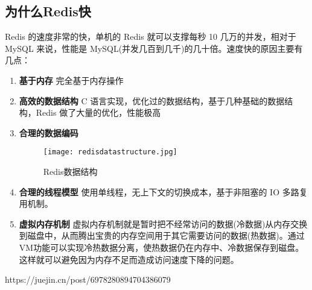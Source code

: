 \documentclass[../../../interview-questions.tex]{subfiles}
\begin{document}
\subsection{为什么Redis快}

Redis 的速度非常的快，单机的 Redis 就可以支撑每秒 10 几万的并发，相对于 MySQL 来说，性能是 MySQL(并发几百到几千)的几十倍。速度快的原因主要有几点：

\begin{enumerate}
    \item {\bf{基于内存}} 完全基于内存操作
    \item {\bf{高效的数据结构}} C 语言实现，优化过的数据结构，基于几种基础的数据结构，Redis 做了大量的优化，性能极高
    \item {\bf{合理的数据编码}}
    
\begin{figure}[htbp]
    \centering
    \texttt{[image: redisdatastructure.jpg]}
    \caption{Redis数据结构}
    \label{fig:redisdatastructure}
\end{figure}
    

    \item {\bf{合理的线程模型}} 使用单线程，无上下文的切换成本，基于非阻塞的 IO 多路复用机制。
    \item {\bf{虚拟内存机制}} 虚拟内存机制就是暂时把不经常访问的数据(冷数据)从内存交换到磁盘中，从而腾出宝贵的内存空间用于其它需要访问的数据(热数据)。通过VM功能可以实现冷热数据分离，使热数据仍在内存中、冷数据保存到磁盘。这样就可以避免因为内存不足而造成访问速度下降的问题。
\end{enumerate}

https://juejin.cn/post/6978280894704386079
\end{document}
